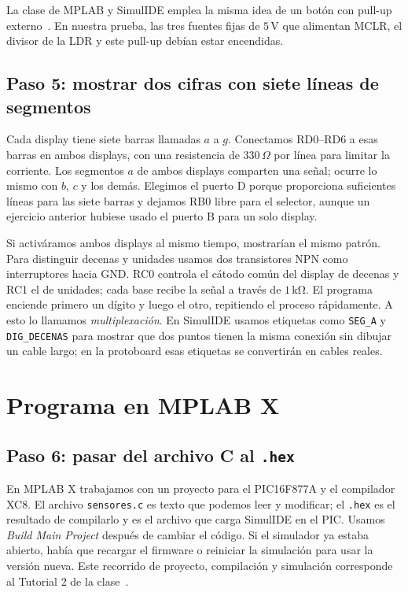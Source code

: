 \documentclass[11pt,a4paper]{article}
\begin{document}
La clase de MPLAB y SimulIDE emplea la misma idea de un botón con pull-up externo~\cite{clasesimulide}. En nuestra prueba, las tres fuentes fijas de \(5\,\mathrm V\) que alimentan MCLR, el divisor de la LDR y este pull-up debían estar encendidas.

\subsection{Paso 5: mostrar dos cifras con siete líneas de segmentos}

Cada display tiene siete barras llamadas $a$ a $g$. Conectamos RD0--RD6 a esas barras en ambos displays, con una resistencia de \(330\,\Omega\) por línea para limitar la corriente. Los segmentos $a$ de ambos displays comparten una señal; ocurre lo mismo con $b$, $c$ y los demás. Elegimos el puerto D porque proporciona suficientes líneas para las siete barras y dejamos RB0 libre para el selector, aunque un ejercicio anterior hubiese usado el puerto B para un solo display.

Si activáramos ambos displays al mismo tiempo, mostrarían el mismo patrón. Para distinguir decenas y unidades usamos dos transistores NPN como interruptores hacia GND. RC0 controla el cátodo común del display de decenas y RC1 el de unidades; cada base recibe la señal a través de \(1\,\mathrm{k\Omega}\). El programa enciende primero un dígito y luego el otro, repitiendo el proceso rápidamente. A esto lo llamamos \emph{multiplexación}. En SimulIDE usamos etiquetas como \texttt{SEG\_A} y \texttt{DIG\_DECENAS} para mostrar que dos puntos tienen la misma conexión sin dibujar un cable largo; en la protoboard esas etiquetas se convertirán en cables reales.

\section{Programa en MPLAB X}

\subsection{Paso 6: pasar del archivo C al \texttt{.hex}}

En MPLAB X trabajamos con un proyecto para el PIC16F877A y el compilador XC8. El archivo \texttt{sensores.c} es texto que podemos leer y modificar; el \texttt{.hex} es el resultado de compilarlo y es el archivo que carga SimulIDE en el PIC. Usamos \emph{Build Main Project} después de cambiar el código. Si el simulador ya estaba abierto, había que recargar el firmware o reiniciar la simulación para usar la versión nueva. Este recorrido de proyecto, compilación y simulación corresponde al Tutorial 2 de la clase~\cite{clasesimulide}.
\end{document}
